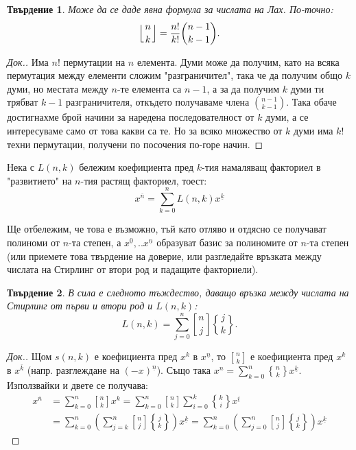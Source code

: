 \documentclass[12pt]{article}
\newcommand{\fallingfactorial}[1]{%
  ^{\underline{#1}}%
}
\newcommand{\risingfactorial}[1]{%
  ^{\overline{#1}}%
}
\newcommand{\genstirlingI}[3]{%
  \genfrac{[}{]}{0pt}{#1}{#2}{#3}%
}
\newcommand{\genstirlingII}[3]{%
  \genfrac{\{}{\}}{0pt}{#1}{#2}{#3}%
}
\newcommand{\stirlingI}[2]{\genstirlingI{}{#1}{#2}}
\newcommand{\stirlingII}[2]{\genstirlingII{}{#1}{#2}}
\newcommand{\genover}[3]{%
  \genfrac{}{}{0pt}{#1}{#2}{#3}%
}
\newcommand{\myover}[2]{\genover{}{#1}{#2}}
\newcommand{\lahfinal}[2]{\left\lfloor \myover{#1}{#2} \right\rfloor}
\newtheorem{theorem}{Твърдение}
\begin{document}
\begin{large}
  \begin{theorem}
    Може да се даде явна формула за числата на Лах. По-точно:
    \[
      \lahfinal{n}{k}=\frac{n!}{k!} \binom{n-1}{k-1}.
    \]
  \end{theorem}

  \begin{proof}[Док.]
    Има $n!$ пермутации на $n$ елемента. Думи може да получим, като на всяка пермутация между елементи сложим "разграничител", така че да получим общо $k$ думи, но местата между $n$-те елемента са $n-1$, а за да получим $k$ думи ти трябват $k-1$ разграничителя, откъдето получаваме члена $\binom{n-1}{k-1}$. Така обаче достигнахме брой начини за наредена последователност от $k$ думи, а се интересуваме само от това какви са те. Но за всяко множество от $k$ думи има $k!$ техни пермутации, получени по посочения по-горе начин.
  \end{proof}

  Нека с $L(n,k)$ бележим коефициента пред $k$-тия намаляващ факториел в "развитието" на $n$-тия растящ факториел, тоест:
  \[
    x\risingfactorial{n}=\sum_{k=0}^{n} L(n,k) x\fallingfactorial{k}
  \]

  Ще отбележим, че това е възможно, тъй като отляво и отдясно се получават полиноми от $n$-та степен, а ${x\fallingfactorial{0},..x\fallingfactorial{n}}$ образуват базис за полиномите от $n$-та степен (или приемете това твърдение на доверие, или разгледайте връзката между числата на Стирлинг от втори род и падащите факториели).

  \begin{theorem}
    В сила е следното тъждество, даващо връзка между числата на Стирлинг от първи и втори род и $L(n,k)$:
    \[
      L(n,k)=\sum_{j=0}^{n} \stirlingI{n}{j} \stirlingII{j}{k}.
    \]
  \end{theorem}

  \begin{proof}[Док.]
    Щом $s\left(n,k\right)$ е коефициента пред $x^{k}$ в $x\fallingfactorial{n}$, то $\stirlingI{n}{k}$ е коефициента пред $x^{k}$ в $x\risingfactorial{k}$ (напр. разглеждане на $(-x)\fallingfactorial{n}$).
    Също така $x^n=\sum_{k=0}^{n} \stirlingII{n}{k} x\fallingfactorial{k}$. Използвайки и двете се получава:
    \begin{equation*}
      \begin{aligned}
        x\risingfactorial{n} &=
        \sum_{k=0}^{n} \stirlingI{n}{k} x^{k} =
        \sum_{k=0}^{n} \stirlingI{n}{k} \sum_{i=0}^{k} \stirlingII{k}{i} x\fallingfactorial{i} \\
        &=
        \sum_{k=0}^{n} \left(\sum_{j=k}^{n} \stirlingI{n}{j} \stirlingII{j}{k} \right) x\fallingfactorial{k} =
        \sum_{k=0}^{n} \left(\sum_{j=0}^{n} \stirlingI{n}{j} \stirlingII{j}{k} \right) x\fallingfactorial{k}
      \end{aligned}
    \end{equation*}


\end{proof}
\end{large}
\end{document}
